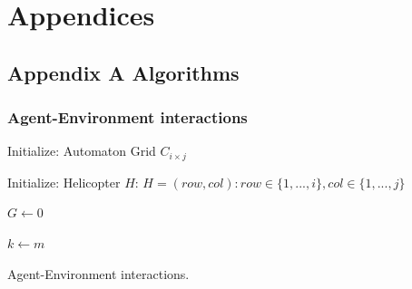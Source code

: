 \documentclass[
  12pt,
  openany]{book}
\begin{document}
\hypertarget{appendices}{%
\chapter*{Appendices}\label{appendices}}

\hypertarget{appendix-a-algorithms-1}{%
\section{Appendix A Algorithms}\label{appendix-a-algorithms-1}}

\hypertarget{agent-environment-interactions}{%
\subsection{Agent-Environment interactions}\label{agent-environment-interactions}}

\newcommand\mycommfont[1]{\small\ttfamily\textcolor{olive}{#1}}
\begin{algorithm}[H]
\DontPrintSemicolon
\SetAlgoLined
{}
\BlankLine
{}

Initialize: Automaton Grid $C_{i \times j}$

Initialize: Helicopter $H$: $H = (row, col): row \in \{1,...,i\}, col \in \{1,...,j\}$

$G \longleftarrow 0$

$k \longleftarrow m$

\caption{Agent-Environment interactions.}
\end{algorithm}
\end{document}
